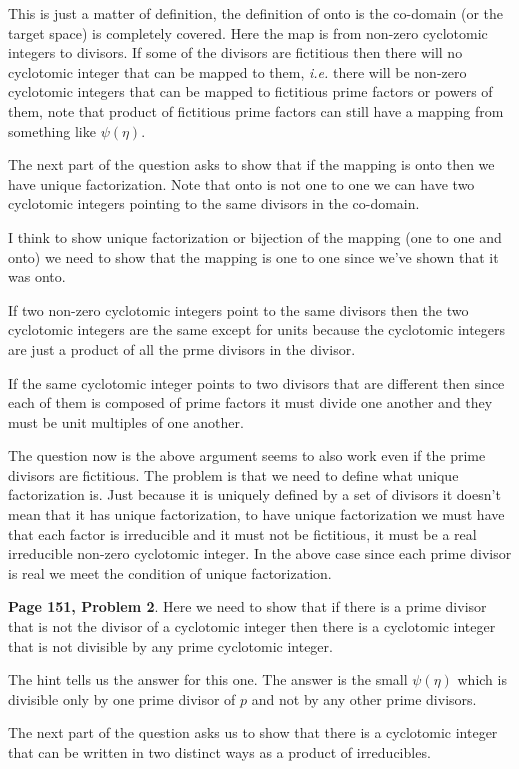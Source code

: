 \documentclass[aps,preprint,preprintnumbers,nofootinbib,showpacs,prd]{revtex4-1}
\newcommand{\ie}{{\it i.e.} }
\begin{document}
This is just a matter of definition, the definition of onto is the co-domain (or the target space) is completely covered. Here the map is from non-zero cyclotomic integers to divisors. If some of the divisors are fictitious then there will no cyclotomic integer that can be mapped to them, \ie there will be non-zero cyclotomic integers that can be mapped to fictitious prime factors or powers of them, note that product of fictitious prime factors can still have a mapping from something like $\psi(\eta)$.

The next part of the question asks to show that if the mapping is onto then we have unique factorization. Note that onto is not one to one we can have two cyclotomic integers pointing to the same divisors in the co-domain.

I think to show unique factorization or bijection of the mapping (one to one and onto) we need to show that the mapping is one to one since we've shown that it was onto.

If two non-zero cyclotomic integers point to the same divisors then the two cyclotomic integers are the same except for units because the cyclotomic integers are just a product of all the prme divisors in the divisor. 

If the same cyclotomic integer points to two divisors that are different then since each of them is composed of prime factors it must divide one another and they must be unit multiples of one another.

The question now is the above argument seems to also work even if the prime divisors are fictitious. The problem is that we need to define what unique factorization is. Just because it is uniquely defined by a set of divisors it doesn't mean that it has unique factorization, to have unique factorization we must have that each factor is irreducible and it must not be fictitious, it must be a real irreducible non-zero cyclotomic integer. In the above case since each prime divisor is real we meet the condition of unique factorization.


{\bf Page 151, Problem 2}. Here we need to show that if there is a prime divisor that is not the divisor of a cyclotomic integer then there is a cyclotomic integer that is not divisible by any prime cyclotomic integer.

The hint tells us the answer for this one. The answer is the small $\psi(\eta)$ which is divisible only by one prime divisor of $p$ and not by any other prime divisors.

The next part of the question asks us to show that there is a cyclotomic integer that can be written in two distinct ways as a product of irreducibles.
\end{document}
